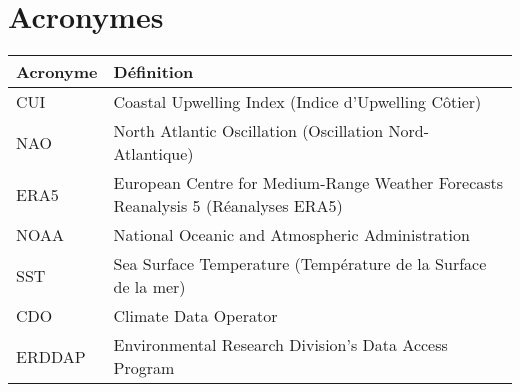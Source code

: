 \newpage
\section*{Acronymes}
\begin{tabular}{|l|p{8cm}|}
\hline
\textbf{Acronyme} & \textbf{Définition} \\
\hline
CUI               & Coastal Upwelling Index (Indice d'Upwelling Côtier) \\
NAO               & North Atlantic Oscillation (Oscillation Nord-Atlantique) \\
ERA5              & European Centre for Medium-Range Weather Forecasts Reanalysis 5 (Réanalyses ERA5) \\
NOAA              & National Oceanic and Atmospheric Administration \\
SST               & Sea Surface Temperature (Température de la Surface de la mer) \\
CDO               & Climate Data Operator \\
ERDDAP			   & Environmental Research Division's Data Access Program \\ 
\hline
\end{tabular}

\newpage

